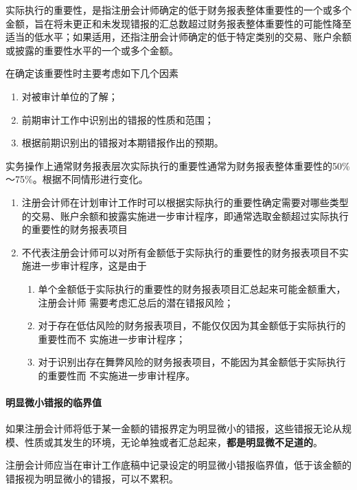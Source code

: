 \documentclass[UTF8,12pt]{ctexart}
\numberwithin{equation}{section} %
\numberwithin{figure}{section}
\numberwithin{table}{section}
\begin{document}
	实际执行的重要性，是指注册会计师确定的低于财务报表整体重要性的一个或多个金额，旨在将未更正和未发现错报的汇总数超过财务报表整体重要性的可能性降至适当的低水平；如果适用，还指注册会计师确定的低于特定类别的交易、账户余额或披露的重要性水平的一个或多个金额。
	
	在确定该重要性时主要考虑如下几个因素
	\begin{enumerate}
		\item 对被审计单位的了解；
		
		\item 前期审计工作中识别出的错报的性质和范围；
		
		\item 根据前期识别出的错报对本期错报作出的预期。
	\end{enumerate}
	
	实务操作上通常财务报表层次实际执行的重要性通常为财务报表整体重要性的50\%～75\%。根据不同情形进行变化。
	
	\begin{enumerate}
		\item 注册会计师在计划审计工作时可以根据实际执行的重要性确定需要对哪些类型的交易、账户余额和披露实施进一步审计程序，即通常选取金额超过实际执行的重要性的财务报表项目
		
		\item 不代表注册会计师可以对所有金额低于实际执行的重要性的财务报表项目不实施进一步审计程序，这是由于
		\begin{enumerate}
			\item 单个金额低于实际执行的重要性的财务报表项目汇总起来可能金额重大，注册会计师
			需要考虑汇总后的潜在错报风险；
			
			\item 对于存在低估风险的财务报表项目，不能仅仅因为其金额低于实际执行的重要性而不
			实施进一步审计程序；
			
			\item 对于识别出存在舞弊风险的财务报表项目，不能因为其金额低于实际执行的重要性而
			不实施进一步审计程序。
		\end{enumerate}
	\end{enumerate}

	
	\paragraph{明显微小错报的临界值}
	如果注册会计师将低于某一金额的错报界定为明显微小的错报，这些错报无论从规模、性质或其发生的环境，无论单独或者汇总起来，\textbf{都是明显微不足道的}。
	
	注册会计师应当在审计工作底稿中记录设定的明显微小错报临界值，低于该金额的错报视为明显微小的错报，可以不累积。
	
\end{document}
